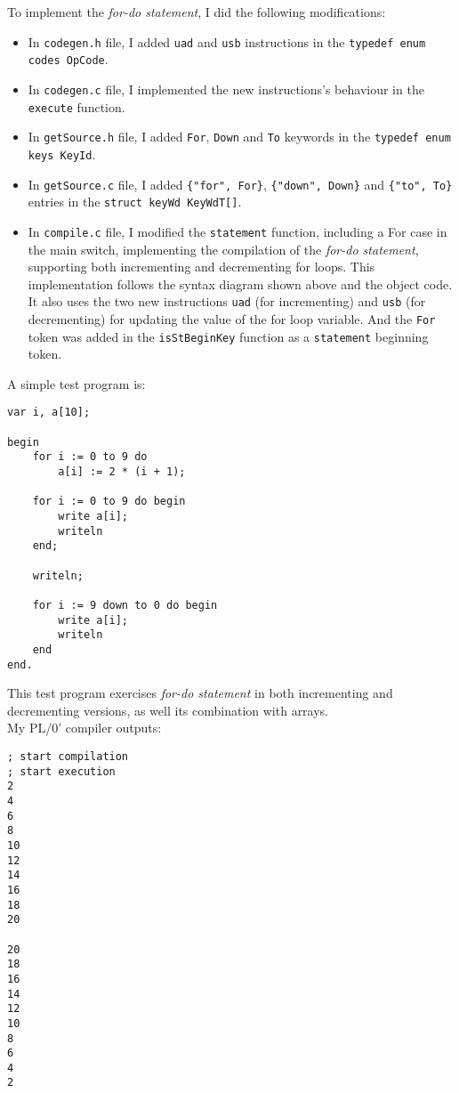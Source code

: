 \documentclass{article}
\begin{document}
To implement the \emph{for-do statement}, I did the following modifications:

\begin{itemize}
    \item In {\tt codegen.h} file, I added {\tt uad} and {\tt usb} instructions
        in the {\tt typedef enum codes OpCode}.
    \item In {\tt codegen.c} file, I implemented the new instructions's
        behaviour in the {\tt execute} function.
    \item In {\tt getSource.h} file, I added {\tt For}, {\tt Down} and {\tt To}
        keywords in the {\tt typedef  enum  keys KeyId}.
    \item In {\tt getSource.c} file, I added {\tt \{"for", For\}},
        {\tt \{"down", Down\}}  and {\tt \{"to", To\}} entries in the {\tt struct keyWd KeyWdT[]}.
    \item In {\tt compile.c} file, I modified the {\tt statement} function,
        including a For case in the main switch, implementing the compilation
        of the \emph{for-do statement}, supporting both incrementing and
        decrementing for loops. This implementation follows the syntax diagram
        shown above and the object code. It also uses the two new instructions
        {\tt uad} (for incrementing) and {\tt usb} (for decrementing) for
        updating the value of the for loop variable. And the {\tt For} token
        was added in the {\tt isStBeginKey} function as a {\tt statement}
        beginning token.
\end{itemize}

A simple test program is:

\clearpage

\begin{verbatim}
var i, a[10];

begin
    for i := 0 to 9 do
        a[i] := 2 * (i + 1);

    for i := 0 to 9 do begin
        write a[i];
        writeln
    end;

    writeln;

    for i := 9 down to 0 do begin
        write a[i];
        writeln
    end
end.
\end{verbatim}

This test program exercises \emph{for-do statement} in both incrementing and
decrementing versions, as well its combination with arrays.\\

My PL/0' compiler outputs:
\begin{verbatim}
; start compilation
; start execution
2 
4 
6 
8 
10 
12 
14 
16 
18 
20 

20 
18 
16 
14 
12 
10 
8 
6 
4 
2 
\end{verbatim}
\end{document}
